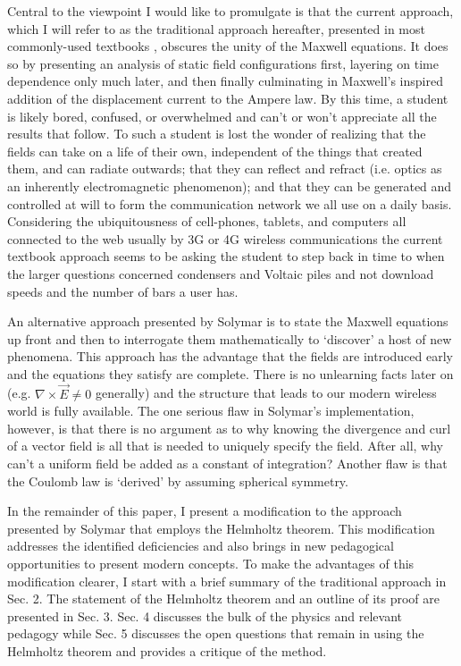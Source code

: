 \documentclass{article}
\begin{document}
Central to the viewpoint I would like to promulgate is that the current approach, which I will 
refer to as the traditional approach hereafter, presented in most commonly-used textbooks \cite{Halliday,Reitz,Jackson,Frankl,Slater,Griffiths}, 
obscures the unity of the Maxwell 
equations. It does so by presenting an analysis of static field configurations first, layering on 
time dependence only much later, and then finally culminating in Maxwell's inspired addition of the 
displacement current to the Ampere law.  By this time, a student is likely bored, confused, or overwhelmed 
and can't or won't appreciate all the results that follow. To such a student is lost the wonder of realizing 
that the fields can take on a life of their own, independent of the things that created them, and can radiate 
outwards; that they can reflect and refract (i.e. optics as an inherently electromagnetic phenomenon); and that 
they can be generated and controlled at will to form the communication network we all use on a daily basis. 
Considering the ubiquitousness of cell-phones, tablets, and computers all connected to the web usually by 3G 
or 4G wireless communications the current textbook approach seems to be asking the student to step back in 
time to when the larger questions concerned condensers and Voltaic piles and not download speeds and the 
number of bars a user has.

An alternative approach presented by Solymar \cite{Solymar} is to state the Maxwell equations up front and then to 
interrogate them mathematically to `discover' a host of new phenomena. This approach has the advantage that 
the fields are introduced early and the equations they satisfy are complete. There is no unlearning facts 
later on (e.g. $\nabla \times \vec E \neq 0$ generally) and the structure that leads to our modern wireless world is 
fully available. The one serious flaw in Solymar's implementation, however, is that there is no argument as to
 why knowing the divergence and curl of a vector field is all that is needed to uniquely specify the field.  
 After all, why can't a uniform field be added as a constant of integration?  Another flaw is that the Coulomb 
 law is `derived' by assuming spherical symmetry. 
 
In the remainder of this paper, I present a modification to the approach presented by Solymar that employs 
the Helmholtz theorem.  This modification addresses the identified deficiencies and also brings in new 
pedagogical opportunities to present modern concepts.  To make the advantages of this modification clearer, 
I start with a brief summary of the traditional approach in Sec. 2.  The statement of the Helmholtz theorem 
and an outline of its proof are presented in Sec. 3.  Sec. 4 discusses the bulk of the physics and relevant pedagogy 
while Sec. 5 discusses the open questions that remain in using the Helmholtz theorem and provides a critique of the method.
\end{document}
